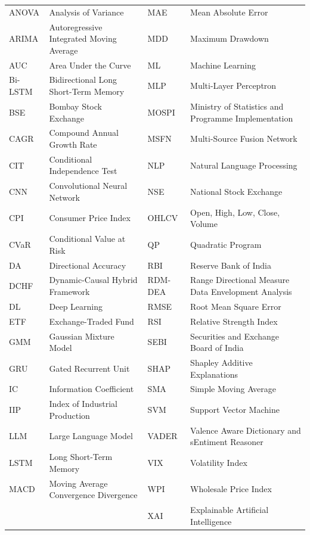 \begin{center}
\footnotesize
{}
\begin{tabular}{@{}p{1.9cm}p{4.5cm}p{1.9cm}p{4.9cm}@{}}
ANOVA & Analysis of Variance & MAE & Mean Absolute Error\\
ARIMA & Autoregressive Integrated Moving Average & MDD & Maximum Drawdown\\
AUC & Area Under the Curve & ML & Machine Learning\\
Bi-LSTM & Bidirectional Long Short-Term Memory & MLP & Multi-Layer Perceptron\\
BSE & Bombay Stock Exchange & MOSPI & Ministry of Statistics and Programme Implementation\\
CAGR & Compound Annual Growth Rate & MSFN & Multi-Source Fusion Network\\
CIT & Conditional Independence Test & NLP & Natural Language Processing\\
CNN & Convolutional Neural Network & NSE & National Stock Exchange\\
CPI & Consumer Price Index & OHLCV & Open, High, Low, Close, Volume\\
CVaR & Conditional Value at Risk & QP & Quadratic Program\\
DA & Directional Accuracy & RBI & Reserve Bank of India\\
DCHF & Dynamic-Causal Hybrid Framework & RDM-DEA & Range Directional Measure Data Envelopment
Analysis\\
DL & Deep Learning & RMSE & Root Mean Square Error\\
ETF & Exchange-Traded Fund & RSI & Relative Strength Index\\
GMM & Gaussian Mixture Model & SEBI & Securities and Exchange Board of India\\
GRU & Gated Recurrent Unit & SHAP & Shapley Additive Explanations\\
IC & Information Coefficient & SMA & Simple Moving Average\\
IIP & Index of Industrial Production & SVM & Support Vector Machine\\
LLM & Large Language Model & VADER & Valence Aware Dictionary and sEntiment Reasoner\\
LSTM & Long Short-Term Memory & VIX & Volatility Index\\
MACD & Moving Average Convergence Divergence & WPI & Wholesale Price Index\\
& & XAI & Explainable Artificial Intelligence\\
\end{tabular}
\end{center}
